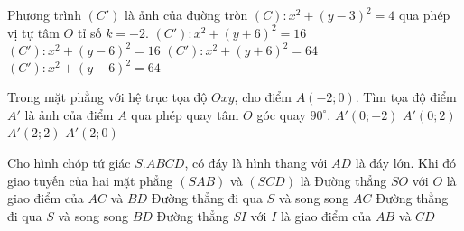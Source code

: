 \begin{ex}%
	Phương trình $\left({C}'\right)$ là ảnh của đường tròn $(C):x^2+{\left(y-3\right)}^2=4$ qua phép vị tự tâm $O$ tỉ số $k=-2.$ 
	\choice
	{\True $\left({C}'\right):x^2+{\left(y+6\right)}^2=16$}
	{$\left({C}'\right):x^2+{\left(y-6\right)}^2=16$}
	{$\left({C}'\right):x^2+{\left(y+6\right)}^2=64$}
	{$\left({C}'\right):x^2+{\left(y-6\right)}^2=64$}
\end{ex}

\begin{ex}%
	Trong mặt phẳng với hệ trục tọa độ $Oxy$, cho điểm $A\left(-2;0\right)$. Tìm tọa độ điểm ${A}'$ là ảnh của điểm $A$ qua phép quay tâm $O$ góc quay $90^\circ $.
	\choice
	{\True ${A}'\left(0;-2\right)$}
	{${A}'\left(0;2\right)$}
	{${A}'\left(2;2\right)$}
	{${A}'\left(2;0\right)$}
\end{ex}

\begin{ex}%
		Cho hình chóp tứ giác $S.ABCD$, có đáy là hình thang với $AD$ là đáy lớn. Khi đó giao tuyến của hai mặt phẳng $\left(SAB\right)$ và $\left(SCD\right)$ là
		\choice
		{Đường thẳng $SO$ với $O$ là giao điểm của $AC$ và $BD$}
		{Đường thẳng đi qua $S$ và song song $AC$}
		{Đường thẳng đi qua $S$ và song song $BD$}
		{\True Đường thẳng $SI$ với $I$ là giao điểm của $AB$ và $CD$}
	\end{ex}

